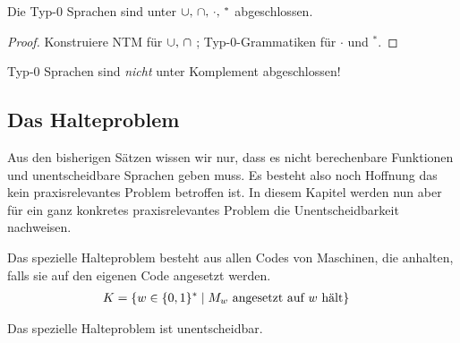 {\begin{Satz}[name={[Abgeschlossenheit von Typ-0 Sprachen]}]\label{satz:Typ-0-abgeschl}
	Die Typ-0 Sprachen sind unter $\thinmuskip=6mu\cup,\cap,\cdot,{}^*$ abgeschlossen.
\end{Satz}
\begin{proof}
	Konstruiere \ac{NTM} für $\thinmuskip=6mu\cup,\cap$ ; Typ-0-Grammatiken für $\cdot$ und $^*$.
\end{proof}

\begin{Bem}
	Typ-0 Sprachen sind \emph{nicht} unter Komplement abgeschlossen!
\end{Bem}
}


\subsection{Das Halteproblem}
Aus den bisherigen Sätzen wissen wir nur, 
dass es nicht berechenbare Funktionen und unentscheidbare Sprachen geben muss.
Es besteht also noch Hoffnung das kein praxisrelevantes Problem betroffen ist.
In diesem Kapitel werden nun aber für ein ganz konkretes praxisrelevantes Problem die Unentscheidbarkeit nachweisen.


\begin{Def}[name={[Spezielles Halteproblem]}]
  Das spezielle Halteproblem besteht aus allen Codes von Maschinen, die
  anhalten, falls sie auf den eigenen Code angesetzt werden.
  \begin{align*}
    K &= \{ w \in \{0,1\}^* \mid M_w \text{ angesetzt auf }w\text{
        hält} \}\qedhere
  \end{align*}
\end{Def}
\begin{Satz}\label{satz:speziellesHalteproblem}
  Das spezielle Halteproblem ist unentscheidbar.
\end{Satz}


